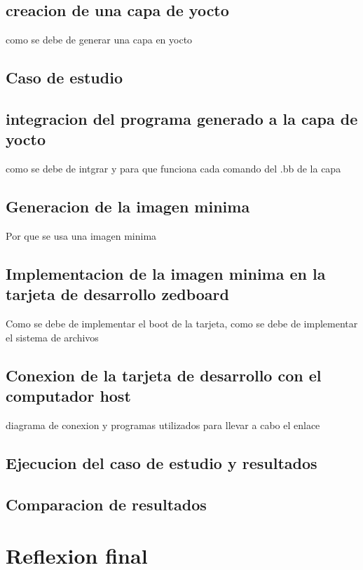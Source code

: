 \subsection{creacion de una capa de yocto}
como se debe de generar una capa en yocto
\subsection{Caso de estudio}
\subsection{integracion del programa generado a la capa de yocto}
como se debe de intgrar y para que funciona cada comando del .bb de la capa
\subsection{Generacion de la imagen minima}
Por que se usa una imagen minima 
\subsection{Implementacion de la imagen minima en la tarjeta de desarrollo zedboard}
Como se debe de implementar el boot de la tarjeta, como se debe de implementar el  sistema de archivos
\subsection{Conexion de la tarjeta de desarrollo con el computador host}
diagrama de conexion y programas utilizados para llevar a cabo el enlace

\subsection{Ejecucion del caso de estudio y resultados}

\subsection{Comparacion de resultados}

\section{Reflexion final}